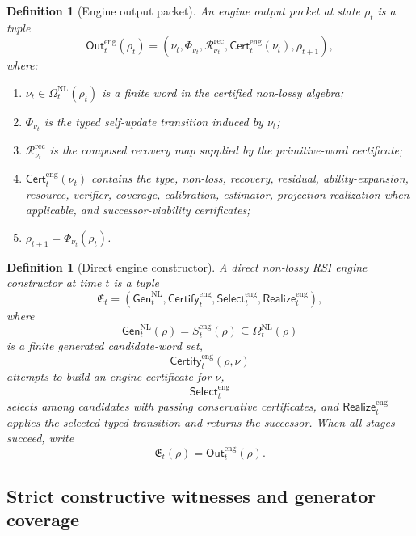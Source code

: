 \documentclass[11pt]{article}
\newtheorem{definition}[theorem]{Definition}
\newcommand{\Rcal}{\mathcal{R}}
\newcommand{\1}{\mathbf{1}}
\begin{document}
\begin{definition}[Engine output packet]
\label{def:engine_output_packet}
An engine output packet at state \(\rho_t\) is a tuple
\[
\mathsf{Out}_t^{\mathrm{eng}}(\rho_t)
=
(\nu_t,\Phi_{\nu_t},\Rcal_{\nu_t}^{\mathrm{rec}},\mathsf{Cert}_t^{\mathrm{eng}}(\nu_t),\rho_{t+1}),
\]
where:
\begin{enumerate}[label=(\roman*),leftmargin=1.5em]
    \item \(\nu_t\in\Omega_t^{\mathrm{NL}}(\rho_t)\) is a finite word in the certified non-lossy algebra;
    \item \(\Phi_{\nu_t}\) is the typed self-update transition induced by \(\nu_t\);
    \item \(\Rcal_{\nu_t}^{\mathrm{rec}}\) is the composed recovery map supplied by the primitive-word certificate;
    \item \(\mathsf{Cert}_t^{\mathrm{eng}}(\nu_t)\) contains the type, non-loss, recovery, residual, ability-expansion, resource, verifier, coverage, calibration, estimator, projection-realization when applicable, and successor-viability certificates;
    \item \(\rho_{t+1}=\Phi_{\nu_t}(\rho_t)\).
\end{enumerate}
\end{definition}

\begin{definition}[Direct engine constructor]
\label{def:direct_engine_constructor}
A direct non-lossy RSI engine constructor at time \(t\) is a tuple
\[
\mathfrak E_t
=
(\mathsf{Gen}_t^{\mathrm{NL}},\mathsf{Certify}_t^{\mathrm{eng}},\mathsf{Select}_t^{\mathrm{eng}},\mathsf{Realize}_t^{\mathrm{eng}}),
\]
where
\[
\mathsf{Gen}_t^{\mathrm{NL}}(\rho)
=
S_t^{\mathrm{eng}}(\rho)\subseteq\Omega_t^{\mathrm{NL}}(\rho)
\]
is a finite generated candidate-word set,
\[
\mathsf{Certify}_t^{\mathrm{eng}}(\rho,\nu)
\]
attempts to build an engine certificate for \(\nu\),
\[
\mathsf{Select}_t^{\mathrm{eng}}
\]
selects among candidates with passing conservative certificates, and \(\mathsf{Realize}_t^{\mathrm{eng}}\) applies the selected typed transition and returns the successor.  When all stages succeed, write
\[
\mathfrak E_t(\rho)=\mathsf{Out}_t^{\mathrm{eng}}(\rho).
\]
\end{definition}

\subsection{Strict constructive witnesses and generator coverage}
\end{document}

